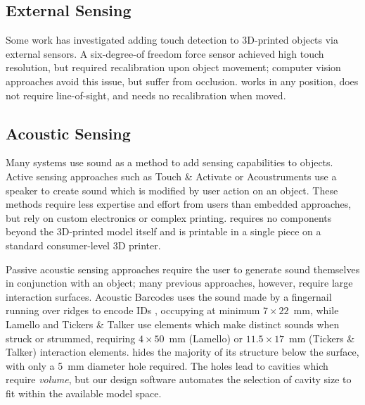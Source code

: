     \subsection{External Sensing}
        Some work has investigated adding touch detection to 3D-printed objects
        via external sensors. A six-degree-of freedom force sensor
        \cite{Hudin:2016fp} achieved high touch resolution, but required
        recalibration upon object movement; computer vision approaches
        \cite{Reichinger:2016ec,Shi:2016bn} avoid this issue, but suffer from
        occlusion. \bh works in any position, does not require line-of-sight,
        and needs no recalibration when moved.
        
    \subsection{Acoustic Sensing}
        Many systems use sound as a method to add sensing capabilities to
        objects. Active sensing approaches such as Touch \& Activate
        \cite{Ono:2013cja} or Acoustruments \cite{Laput:2015hn} use a speaker to
        create sound which is modified by user action on an object. These
        methods require less expertise and effort from users than embedded
        approaches, but rely on custom electronics or complex printing. \bh
        requires no components beyond the 3D-printed model itself and is
        printable in a single piece on a standard consumer-level 3D printer.
    
        Passive acoustic sensing approaches require the user to generate sound
        themselves in conjunction with an object; many previous approaches,
        however, require large interaction surfaces. Acoustic Barcodes uses the
        sound made by a fingernail running over ridges to encode IDs
        \cite{Harrison:2012kw}, occupying at minimum $7\times 22$~mm, while
        Lamello \cite{Savage:2015cs} and Tickers \& Talker \cite{Shi:2016ff} use
        elements which make distinct sounds when struck or strummed, requiring
        $4\times 50$~mm (Lamello) or $11.5\times 17$~mm (Tickers \& Talker)
        interaction elements. \bh hides the majority of its structure below the
        surface, with only a 5~mm diameter hole required. The holes lead to
        cavities which require \textit{volume}, but our design software
        automates the selection of cavity size to fit within the available model
        space.
        
